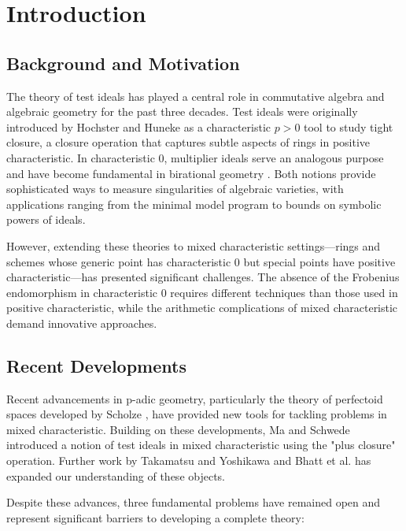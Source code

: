 \section{Introduction}

\subsection{Background and Motivation}

The theory of test ideals has played a central role in commutative algebra and algebraic geometry for the past three decades. Test ideals were originally introduced by Hochster and Huneke \cite{HH90} as a characteristic $p > 0$ tool to study tight closure, a closure operation that captures subtle aspects of rings in positive characteristic. In characteristic 0, multiplier ideals serve an analogous purpose and have become fundamental in birational geometry \cite{Laz04}. Both notions provide sophisticated ways to measure singularities of algebraic varieties, with applications ranging from the minimal model program to bounds on symbolic powers of ideals.

However, extending these theories to mixed characteristic settings—rings and schemes whose generic point has characteristic 0 but special points have positive characteristic—has presented significant challenges. The absence of the Frobenius endomorphism in characteristic 0 requires different techniques than those used in positive characteristic, while the arithmetic complications of mixed characteristic demand innovative approaches.

\subsection{Recent Developments}

Recent advancements in p-adic geometry, particularly the theory of perfectoid spaces developed by Scholze \cite{Sch12}, have provided new tools for tackling problems in mixed characteristic. Building on these developments, Ma and Schwede \cite{MS21} introduced a notion of test ideals in mixed characteristic using the "plus closure" operation. Further work by Takamatsu and Yoshikawa \cite{TY21} and Bhatt et al. \cite{BMP+23} has expanded our understanding of these objects.

Despite these advances, three fundamental problems have remained open and represent significant barriers to developing a complete theory:

